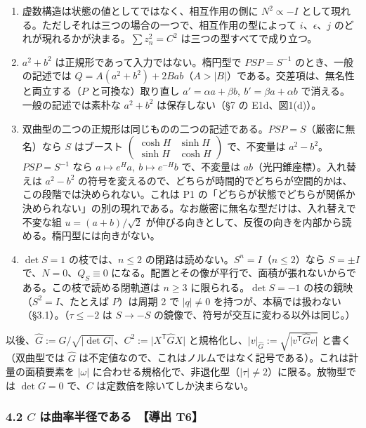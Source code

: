 \documentclass[
  a4paper,
]{ltjsarticle}
\begin{document}
\begin{enumerate}
\def\labelenumi{(\roman{enumi})}
\item
  虚数構造は状態の値としてではなく、相互作用の側に \(N^2\propto-I\)
  として現れる。ただしそれは三つの場合の一つで、相互作用の型によって
  \(i\)、\(\epsilon\)、\(j\)
  のどれが現れるかが決まる。\(\sum z_n^2=C^2\)
  は三つの型すべてで成り立つ。
\item
  \(a^2+b^2\) は正規形であって入力ではない。楕円型で \(PSP=S^{-1}\)
  のとき、一般の記述では
  \(Q=A(a^2+b^2)+2Bab\)（\(A>\lvert B\rvert\)）である。交差項は、無名性と両立する（\(P\)
  と可換な）取り直し \(a'=\alpha a+\beta b,\ b'=\beta a+\alpha b\)
  で消える。一般の記述では素朴な \(a^2+b^2\) は保存しない（§7 の
  E1d、図1(d)）。
\item
  双曲型の二つの正規形は同じものの二つの記述である。\(PSP=S\)（厳密に無名）なら
  \(S\) はブースト
  \(\begin{pmatrix}\cosh H&\sinh H\\\sinh H&\cosh H\end{pmatrix}\)
  で、不変量は \(a^2-b^2\)。\(PSP=S^{-1}\) なら
  \(a\mapsto e^Ha,\ b\mapsto e^{-H}b\) で、不変量は
  \(ab\)（光円錐座標）。入れ替えは \(a^2-b^2\)
  の符号を変えるので、どちらが時間的でどちらが空間的かは、この段階では決められない。これは
  P1
  の「どちらが状態でどちらが関係か決められない」の別の現れである。なお厳密に無名な型だけは、入れ替えで不変な組
  \(u=(a+b)/\sqrt2\)
  が伸びる向きとして、反復の向きを内部から読める。楕円型には向きがない。
\item
  \(\det S=1\) の枝では、\(n\le2\)
  の閉路は読めない。\(S^n=I\)（\(n\le2\)）なら \(S=\pm I\)
  で、\(N=0\)、\(Q_S\equiv0\)
  になる。配置とその像が平行で、面積が張れないからである。この枝で読める閉軌道は
  \(n\ge3\) に限られる。\(\det S=-1\) の枝の鏡映（\(S^2=I\)、たとえば
  \(P\)）は周期 2 で \(\lvert q\rvert\neq0\)
  を持つが、本稿では扱わない（§3.1）。（\(\tau\le-2\) は \(S\to-S\)
  の鏡像で、符号が交互に変わる以外は同じ。）
\end{enumerate}

以後、\(\hat G:=G/\sqrt{\lvert\det G\rvert}\)、\(C^2:=\lvert X^{\mathsf T}\hat GX\rvert\)
と規格化し、\(\lvert v\rvert_{\hat G}:=\sqrt{\lvert v^{\mathsf T}\hat Gv\rvert}\)
と書く（双曲型では \(\hat G\)
は不定値なので、これはノルムではなく記号である）。これは計量の面積要素を
\(\lvert\omega\rvert\)
に合わせる規格化で、非退化型（\(\lvert\tau\rvert\neq2\)）に限る。放物型では
\(\det G=0\) で、\(C\) は定数倍を除いてしか決まらない。

\subsubsection{\texorpdfstring{4.2 \(C\) は曲率半径である　【導出
T6】}{4.2 C は曲率半径である　【導出 T6】}}\label{c-ux306fux66f2ux7387ux534aux5f84ux3067ux3042ux308b-ux5c0eux51fa-t6}
\end{document}
